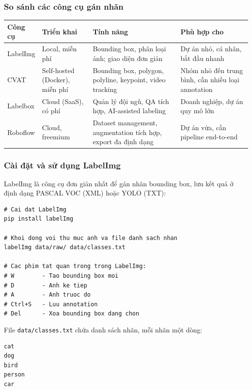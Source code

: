 \subsubsection{So sánh các công cụ gán nhãn}

\begin{center}
\begin{tabular}{|p{2.5cm}|p{2.8cm}|p{3.5cm}|p{4cm}|}
\hline
\textbf{Công cụ} & \textbf{Triển khai} & \textbf{Tính năng} & \textbf{Phù hợp cho} \\
\hline
LabelImg & Local, miễn phí & Bounding box, phân loại ảnh; giao diện đơn giản & Dự án nhỏ, cá nhân, bắt đầu nhanh \\
\hline
CVAT & Self-hosted (Docker), miễn phí & Bounding box, polygon, polyline, keypoint, video tracking & Nhóm nhỏ đến trung bình, cần nhiều loại annotation \\
\hline
Labelbox & Cloud (SaaS), có phí & Quản lý đội ngũ, QA tích hợp, AI-assisted labeling & Doanh nghiệp, dự án quy mô lớn \\
\hline
Roboflow & Cloud, freemium & Dataset management, augmentation tích hợp, export đa định dạng & Dự án vừa, cần pipeline end-to-end \\
\hline
\end{tabular}
\end{center}

\subsubsection{Cài đặt và sử dụng LabelImg}

LabelImg là công cụ đơn giản nhất để gán nhãn bounding box, lưu kết quả ở định dạng PASCAL VOC (XML) hoặc YOLO (TXT):

\begin{verbatim}
# Cai dat LabelImg
pip install labelImg

# Khoi dong voi thu muc anh va file danh sach nhan
labelImg data/raw/ data/classes.txt

# Cac phim tat quan trong trong LabelImg:
# W        - Tao bounding box moi
# D        - Anh ke tiep
# A        - Anh truoc do
# Ctrl+S   - Luu annotation
# Del      - Xoa bounding box dang chon
\end{verbatim}

File \texttt{data/classes.txt} chứa danh sách nhãn, mỗi nhãn một dòng:

\begin{verbatim}
cat
dog
bird
person
car
\end{verbatim}

